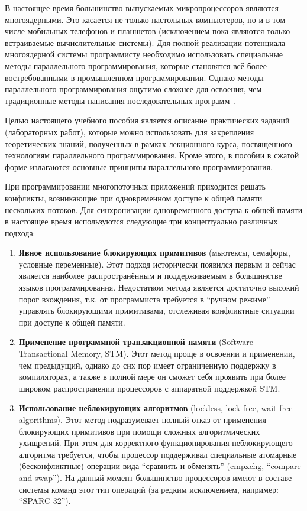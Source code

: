 
В настоящее время большинство выпускаемых микропроцессоров являются многоядерными.
Это касается не только настольных компьютеров, но и в том числе мобильных телефонов и планшетов (исключением пока являются только встраиваемые вычислительные системы).
Для полной реализации потенциала многоядерной системы программисту необходимо использовать специальные методы параллельного программирования, которые становятся всё более востребованными в промышленном программировании.
Однако методы параллельного программирования ощутимо сложнее для освоения, чем традиционные методы написания последовательных программ~\cite{Galiakhmetova2019}.

Целью настоящего учебного пособия является описание практических заданий (лабораторных работ), которые можно использовать для закрепления теоретических знаний, полученных в рамках лекционного курса, посвященного технологиям параллельного программирования. Кроме этого, в пособии в сжатой форме излагаются основные принципы параллельного программирования.%

При программировании многопоточных приложений приходится решать конфликты, возникающие при одновременном доступе к общей памяти нескольких потоков.
Для синхронизации одновременного доступа к общей памяти в настоящее время используются следующие три концептуально различных подхода:

\begin{enumerate}
    \sloppy
    \item\textbf{Явное использование блокирующих примитивов} (мьютексы, семафоры, условные переменные).
    Этот подход исторически появился первым и сейчас является наиболее распространённым и поддерживаемым в большинстве языков программирования.
    Недостатком метода является достаточно высокий порог вхождения, т.к. от программиста требуется в \enquote{ручном режиме} управлять блокирующими примитивами, отслеживая конфликтные ситуации при доступе к общей памяти.
    \item\textbf{Применение программной транзакционной памяти} (Software Transactional Memory, STM).
    Этот метод проще в освоении и применении, чем предыдущий, однако до сих пор имеет ограниченную поддержку в компиляторах, а также в полной мере он сможет себя проявить при более широком распространении процессоров с аппаратной поддержкой STM.
    \item\textbf{Использование неблокирующих алгоритмов} (lockless, lock-free, wait-free algorithms).
    Этот метод подразумевает полный отказ от применения блокирующих примитивов при помощи сложных алгоритмических ухищрений.
    При этом для корректного функционирования неблокирующего алгоритма требуется, чтобы процессор поддерживал специальные атомарные (бесконфликтные) операции вида \enquote{сравнить и обменять} (cmpxchg, \enquote{compare and swap}).
    На данный момент большинство процессоров имеют в составе системы команд этот тип операций (за редким исключением, например: \enquote{SPARC 32}).
\end{enumerate}

